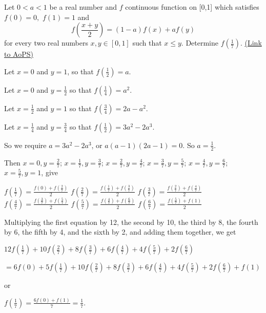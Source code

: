 \begin{problem}
	Let $0<a<1$ be a real number and $f$ continuous function on [0,1] which satisfies $f(0)=0,$ $f(1)=1$ and  \[ f(\frac{x+y}{2})=(1-a)f(x)+af(y) \] for every two real numbers $x,y\in [0,1]$ such that $x\le y$. Determine $f(\frac{1}{7}).$
	\flushright \href{https://artofproblemsolving.com/community/c6h536136}{(Link to AoPS)}
\end{problem}



\begin{solution}
	Let $x=0$ and $y=1$, so that $f\left(\frac{1}{2}\right)=a$.

Let $x=0$ and $y=\frac{1}{2}$ so that $f\left(\frac{1}{4}\right)=a^2$.

Let $x=\frac{1}{2}$ and $y=1$ so that $f\left(\frac{3}{4}\right)=2a-a^2$.

Let $x=\frac{1}{4}$ and $y=\frac{3}{4}$ so that $f\left(\frac{1}{2}\right)=3a^2-2a^3$.

So we require $a=3a^2-2a^3$, or $a(a-1)(2a-1)=0$.  So $a=\frac{1}{2}$.

Then $x=0, y=\frac{2}{7}$; $x=\frac{1}{7}, y=\frac{3}{7}$; $x=\frac{2}{7}, y=\frac{4}{7}$; $x=\frac{3}{7}, y=\frac{5}{7}$; $x=\frac{4}{7}, y=\frac{6}{7}$; $x=\frac{5}{7}, y=1$, give

$f\left(\frac{1}{7}\right)=\frac{f(0)+f\left(\frac{2}{7}\right)}{2}$
$f\left(\frac{2}{7}\right)=\frac{f\left(\frac{1}{7}\right)+f\left(\frac{3}{7}\right)}{2}$
$f\left(\frac{3}{7}\right)=\frac{f\left(\frac{2}{7}\right)+f\left(\frac{4}{7}\right)}{2}$
$f\left(\frac{4}{7}\right)=\frac{f\left(\frac{3}{7}\right)+f\left(\frac{5}{7}\right)}{2}$
$f\left(\frac{5}{7}\right)=\frac{f\left(\frac{4}{7}\right)+f\left(\frac{6}{7}\right)}{2}$
$f\left(\frac{6}{7}\right)=\frac{f\left(\frac{5}{7}\right)+f(1)}{2}$

Multiplying the first equation by 12, the second by 10, the third by 8, the fourth by 6, the fifth by 4, and the sixth by 2, and adding them together, we get

$12f\left(\frac{1}{7}\right)+10f\left(\frac{2}{7}\right)+8f\left(\frac{3}{7}\right)+6f\left(\frac{4}{7}\right)+4f\left(\frac{5}{7}\right)+2f\left(\frac{6}{7}\right)$

$=6f(0)+5f\left(\frac{1}{7}\right)+10f\left(\frac{2}{7}\right)+8f\left(\frac{3}{7}\right)+6f\left(\frac{4}{7}\right)+4f\left(\frac{5}{7}\right)+2f\left(\frac{6}{7}\right)+f(1)$

or

$f\left(\frac{1}{7}\right)=\frac{6f(0)+f(1)}{7}=\frac{1}{7}$.
\end{solution}



